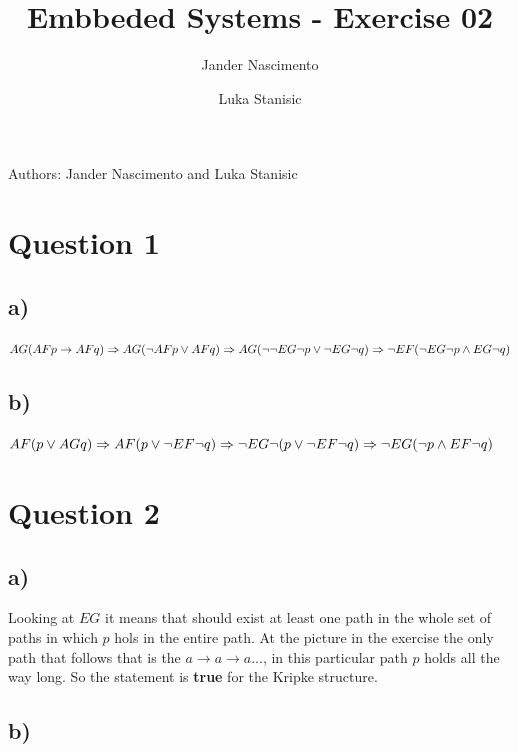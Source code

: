 \documentclass[a4paper]{article}
\begin{document}
\title{Embbeded Systems - Exercise 02}

\author{Jander Nascimento \and Luka Stanisic}


Authors: Jander Nascimento and Luka Stanisic

\section{Question 1}

\subsection*{a)}

$
AG(AF p \to AF q) \Rightarrow
\newline AG (\neg AF p \lor AF q) \Rightarrow
\newline AG( \neg \neg EG \neg p \lor \neg EG \neg q ) \Rightarrow
\newline \neg EF ( \neg EG \neg p \land EG \neg q )
$

\subsection*{b)}

$
AF(p \lor AG q) \Rightarrow
\newline AF (p \lor \neg EF \neg q) \Rightarrow
\newline \neg  EG \neg (p \lor \neg EF \neg q) \Rightarrow
\newline \neg EG (\neg p \land  EF \neg q)
$

\section{Question 2}

\subsection*{a)}
Looking at $EG$ it means that should exist at least one path in the whole set of paths in which $p$ hols in the entire path. 
At the picture in the exercise the only path that follows that is the $a \to a \to a ...$, in this particular path $p$ holds all the way long. So the statement is \textbf{true} for the Kripke structure. 

\subsection*{b)}
\end{document}
